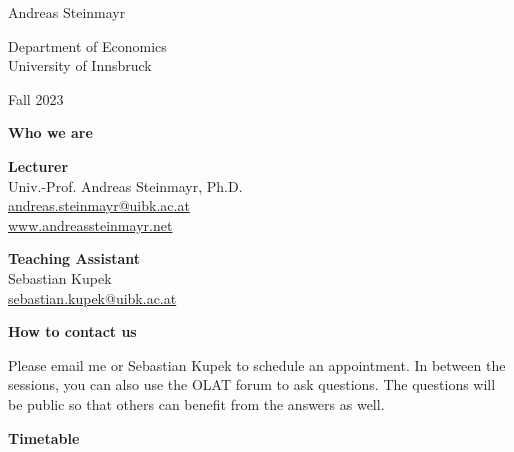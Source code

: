 \documentclass[
  25pt,         %
  a4paper,
  landscape,
  Screen4to3,
  footrule ]{foils}
\begin{document}
\setlength{\parindent}{0pt}



\thispagestyle{empty}

\begin{center}

Andreas Steinmayr \\ 

\bigskip \bigskip \bigskip

Department of Economics \\
University of Innsbruck \bigskip

Fall 2023

\end{center}




\setcounter{page}{0}


\textbf{Who we are}

\textbf{Lecturer} \\
Univ.-Prof. Andreas Steinmayr, Ph.D. \\ 
\href{mailto:andreas.steinmayr@uibk.ac.at}{andreas.steinmayr@uibk.ac.at} \\ \url{www.andreassteinmayr.net}
\bigskip

\textbf{Teaching Assistant} \\
Sebastian Kupek \\
\href{mailto:sebastian.kupek@uibk.ac.at}{sebastian.kupek@uibk.ac.at}



\textbf{How to contact us}

\bi
   \x Please email me or Sebastian Kupek to schedule an appointment.
   \x In between the sessions, you can also use the OLAT forum to ask questions. The questions will be public so that others can benefit from the answers as well.
\ei


\textbf{Timetable}
\end{document}
